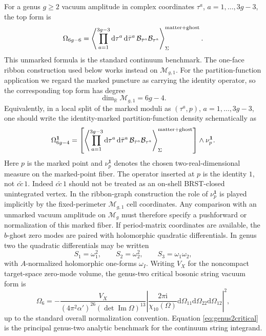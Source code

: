 \documentclass[11pt]{article}
\numberwithin{equation}{section}
\newcommand{\A}{\alpha'}
\newcommand{\bR}{\mathbb R}
\newcommand{\cB}{\mathcal B}
\newcommand{\cM}{\mathcal M}
\newcommand{\dd}{\mathrm d}
\newcommand{\ii}{\mathrm i}
\newcommand{\im}{\operatorname{Im}}
\begin{document}
For a genus \(g\geq2\) vacuum amplitude in complex coordinates
\(\tau^a\), \(a=1,\ldots,3g-3\), the top form is
\begin{equation}
        \Omega_{6g-6}
        =
        \left\langle
        \prod_{a=1}^{3g-3}
        \dd\tau^a\,\dd\bar\tau^a\,
        \cB_{\bar\tau^a}\cB_{\tau^a}
        \right\rangle_{\Sigma}^{\rm matter+ghost}.
        \label{eq:vacuumform}
\end{equation}
This unmarked formula is the standard continuum benchmark.  The one-face
ribbon construction used below works instead on \(\cM_{g,1}\).  For the
partition-function application we regard the marked puncture as carrying the
identity operator, so the corresponding top form has degree
\begin{equation}
        \dim_{\bR}\cM_{g,1}=6g-4.
        \label{eq:mg1dim}
\end{equation}
Equivalently, in a local split of the marked moduli as
\((\tau^a,p)\), \(a=1,\ldots,3g-3\), one should write the identity-marked
partition-function density schematically as
\begin{equation}
        \Omega_{6g-4}^{\mathbf 1}
        =
        \left[
        \left\langle
        \prod_{a=1}^{3g-3}
        \dd\tau^a\,\dd\bar\tau^a\,
        \cB_{\bar\tau^a}\cB_{\tau^a}
        \right\rangle_{\Sigma}^{\rm matter+ghost}
        \right]\wedge \nu_p^{\mathbf 1}.
        \label{eq:identityform}
\end{equation}
Here \(p\) is the marked point and \(\nu_p^{\mathbf 1}\) denotes the chosen
two-real-dimensional measure on the marked-point fiber.  The operator inserted
at \(p\) is the identity \(1\), not \(c\widetilde c\,1\).  Indeed
\(c\widetilde c\,1\) should not be treated as an on-shell BRST-closed
unintegrated vertex.  In the ribbon-graph construction the role of
\(\nu_p^{\mathbf 1}\) is played implicitly by the fixed-perimeter
\(\cM_{g,1}\) cell coordinates.  Any comparison with an unmarked vacuum
amplitude on \(\cM_g\) must therefore specify a pushforward or normalization of
this marked fiber.
If period-matrix coordinates are available, the \(b\)-ghost zero modes are
paired with holomorphic quadratic differentials.  In genus two the quadratic
differentials may be written
\begin{equation}
        S_1=\omega_1^2,\qquad
        S_2=\omega_2^2,\qquad
        S_3=\omega_1\omega_2,
\end{equation}
with \(A\)-normalized holomorphic one-forms \(\omega_I\).  Writing \(V_X\) for
the noncompact target-space zero-mode volume, the genus-two critical bosonic
string vacuum form is
\begin{equation}
        \Omega_6
        =
        -
        \frac{V_X}{(4\pi^2\A)^{26}(\det\im\Omega)^{13}}
        \left|
        \frac{2\pi\ii}{\chi_{10}(\Omega)}
        \dd\Omega_{11}\dd\Omega_{22}\dd\Omega_{12}
        \right|^2,
        \label{eq:genus2critical}
\end{equation}
up to the standard overall normalization convention.  Equation
\eqref{eq:genus2critical} is the principal genus-two analytic benchmark for
the continuum string integrand.
\end{document}
